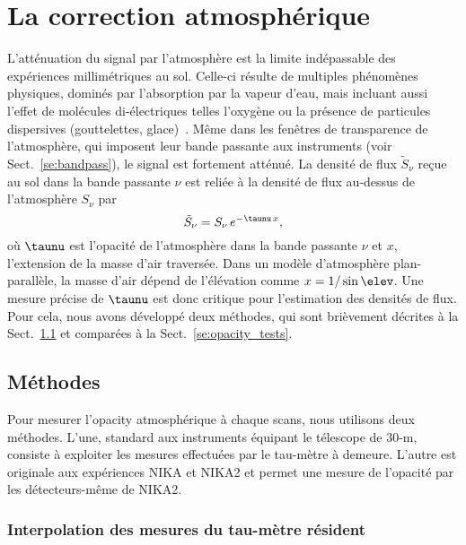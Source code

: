 %
%
\section{La correction atmosphérique}
\label{se:opacity}

L'atténuation du signal par l'atmosphère est la limite indépassable
des expériences millimétriques au sol. Celle-ci résulte de multiples
phénomènes physiques, dominés par l'absorption par la vapeur d'eau,
mais incluant aussi l'effet de molécules di-électriques telles
l'oxygène ou la présence de particules dispersives (gouttelettes,
glace)~\citep{Pardo2002, Pardo2001}. Même dans les fenêtres de
transparence de l'atmosphère, qui imposent leur bande passante aux
instruments (voir Sect.~\ref{se:bandpass}), le signal est fortement
atténué. La densité de
flux $\tilde{S}_\nu$ reçue au sol dans la bande passante $\nu$ est
reliée à la densité de flux au-dessus de l'atmosphère $S_\nu$ par
\begin{equation}
  \tilde{S}_\nu = S_\nu \, e^{-\taunu \, x},
\end{equation}
où $\taunu$ est l'opacité de l'atmosphère dans la bande passante $\nu$
et $x$, l'extension de la masse d'air traversée. Dans un modèle
d'atmosphère plan-parallèle, la masse d'air dépend de l'élévation
comme $x = 1/\sin{\elev}$. Une mesure précise de $\taunu$ est donc
critique pour l'estimation des densités de flux. Pour cela, nous avons
développé deux méthodes, qui sont brièvement décrites à la
Sect.~\ref{se:opacity_methods} et comparées à la
Sect.~\ref{se:opacity_tests}.


\subsection{Méthodes}
\label{se:opacity_methods}

Pour mesurer l'opacity atmosphérique à chaque scans, nous utilisons
deux méthodes. L'une, standard aux instruments équipant le télescope
de 30-m, consiste à exploiter les mesures effectuées par le tau-mètre
à demeure. L'autre est originale aux expériences NIKA et NIKA2 et
permet une mesure de l'opacité par les détecteurs-même de NIKA2.  

\subsubsection{Interpolation des mesures du tau-mètre résident}

